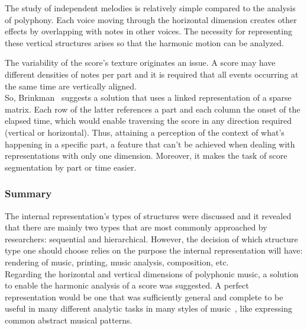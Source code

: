 \documentclass[a4paper,UKenglish]{oasics}
\begin{document}
    The study of independent melodies is relatively simple compared to the analysis of polyphony.
    Each voice moving through the horizontal dimension creates other effects by overlapping with
    notes in other voices. The necessity for representing these vertical structures arises so that
    the harmonic motion can be analyzed.

    The variability of the score's texture originates an issue. A score may have different densities
    of notes per part and it is required that all events occurring at the same time are vertically
    aligned.\\
    So, Brinkman~\cite{Brinkman1984} suggests a solution that uses a linked representation of a
    sparse matrix. Each row of the latter references a part and each column the onset of the elapsed
    time, which would enable traversing the score in any direction required (vertical or
    horizontal). Thus, attaining a perception of the context of what's happening in a specific part,
    a feature that can't be achieved when dealing with representations with only one dimension.
    Moreover, it makes the task of score segmentation by part or time easier.

\subsubsection{Summary} 

    The internal representation's types of structures were discussed and it revealed that there are
    mainly two types that are most commonly approached by researchers: sequential and hierarchical.
    However, the decision of which structure type one should choose relies on the purpose the
    internal representation will have: rendering of music, printing, music analysis, composition,
    etc.\\

    Regarding the horizontal and vertical dimensions of polyphonic music, a solution to enable the
    harmonic analysis of a score was suggested. A perfect representation would be one that was
    sufficiently general and complete to be useful in many different analytic tasks in many styles
    of music~\cite{Honing1993}, like expressing common abstract musical patterns.\\
\end{document}
